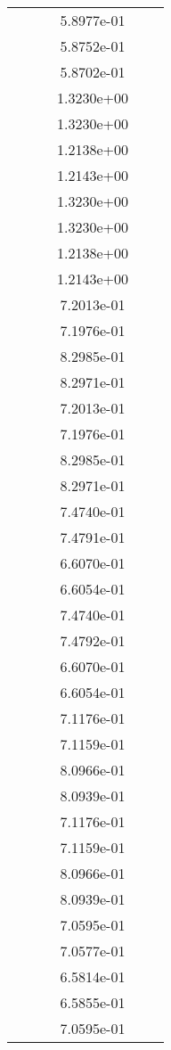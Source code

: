 \begin{xltabular}{\textwidth}{r|rS[table-format=1.3e+2]S[table-format=1.4e+2]S[table-format=1.4e+2]S[table-format=-1.5]}
&  &  & 5.8977e-01 & & \\
&  &  & 5.8752e-01 & & \\
&  &  & 5.8702e-01 & & \\
&  &  & 1.3230e+00 & & \\
&  &  & 1.3230e+00 & & \\
&  &  & 1.2138e+00 & & \\
&  &  & 1.2143e+00 & & \\
&  &  & 1.3230e+00 & & \\
&  &  & 1.3230e+00 & & \\
&  &  & 1.2138e+00 & & \\
&  &  & 1.2143e+00 & & \\
&  &  & 7.2013e-01 & & \\
&  &  & 7.1976e-01 & & \\
&  &  & 8.2985e-01 & & \\
&  &  & 8.2971e-01 & & \\
&  &  & 7.2013e-01 & & \\
&  &  & 7.1976e-01 & & \\
&  &  & 8.2985e-01 & & \\
&  &  & 8.2971e-01 & & \\
&  &  & 7.4740e-01 & & \\
&  &  & 7.4791e-01 & & \\
&  &  & 6.6070e-01 & & \\
&  &  & 6.6054e-01 & & \\
&  &  & 7.4740e-01 & & \\
&  &  & 7.4792e-01 & & \\
&  &  & 6.6070e-01 & & \\
&  &  & 6.6054e-01 & & \\
&  &  & 7.1176e-01 & & \\
&  &  & 7.1159e-01 & & \\
&  &  & 8.0966e-01 & & \\
&  &  & 8.0939e-01 & & \\
&  &  & 7.1176e-01 & & \\
&  &  & 7.1159e-01 & & \\
&  &  & 8.0966e-01 & & \\
&  &  & 8.0939e-01 & & \\
&  &  & 7.0595e-01 & & \\
&  &  & 7.0577e-01 & & \\
&  &  & 6.5814e-01 & & \\
&  &  & 6.5855e-01 & & \\
&  &  & 7.0595e-01 & & \\

\end{xltabular}
